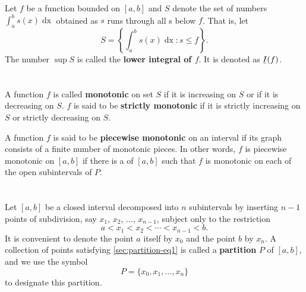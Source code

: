 \documentclass{report}
\begin{document}
\section{}%
\label{sec:def-lower-integral}

Let $f$ be a function bounded on $[a, b]$ and $S$ denote the set of numbers
  $\int_a^b s(x) \mathop{dx}$ obtained as $s$ runs through all
  s below $f$.
That is, let $$S = \left\{ \int_a^b s(x) \mathop{dx} : s \leq f \right\}.$$
The number $\sup{S}$ is called the \textbf{lower integral of $f$}.
It is denoted as $\ubar{I}(f)$.

\section{}%
\label{sec:def-monotonic}

A function $f$ is called \textbf{monotonic} on set $S$ if it is increasing on
  $S$ or if it is decreasing on $S$.
$f$ is said to be \textbf{strictly monotonic} if it is strictly increasing on
  $S$ or strictly decreasing on $S$.

A function $f$ is said to be \textbf{piecewise monotonic} on an interval if its
  graph consists of a finite number of monotonic pieces.
In other words, $f$ is piecewise monotonic on $[a, b]$ if there is a
   of $[a, b]$ such that $f$ is monotonic on each of
  the open subintervals of $P$.

\section{}%
\label{sec:def-partition}

Let $[a, b]$ be a closed interval decomposed into $n$ subintervals by inserting
  $n - 1$ points of subdivision, say $x_1$, $x_2$, $\ldots$, $x_{n-1}$, subject
  only to the restriction
  \begin{equation}
    \label{sec:partition-eq1}
    a < x_1 < x_2 < \cdots < x_{n-1} < b.
  \end{equation}
It is convenient to denote the point $a$ itself by $x_0$ and the point $b$ by
  $x_n$.
A collection of points satisfying \eqref{sec:partition-eq1} is called a
  \textbf{partition} $P$ of $[a, b]$, and we use the symbol
  $$P = \{x_0, x_1, \ldots, x_n\}$$ to designate this partition.

\begin{definition}


\end{definition}
\end{document}
